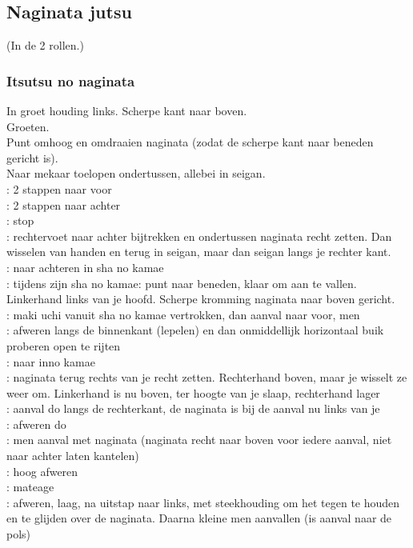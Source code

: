 \subsection{Naginata jutsu}
(In de 2 rollen.)

\subsubsection{Itsutsu no naginata}

In groet houding links. Scherpe kant naar boven.\\
Groeten.\\
Punt omhoog en omdraaien naginata (zodat de scherpe kant naar beneden gericht is).\\
Naar mekaar toelopen ondertussen, allebei in seigan.\\
\pA: 2 stappen naar voor\\
\pB: 2 stappen naar achter\\
\pA: stop\\
\pB: rechtervoet naar achter bijtrekken en ondertussen naginata recht zetten. Dan wisselen van handen en terug in seigan, maar dan seigan langs je rechter kant.\\
\pA: naar achteren in sha no kamae\\
\pB: tijdens \pA zijn sha no kamae: punt naar beneden, klaar om aan te vallen. Linkerhand links van je hoofd. Scherpe kromming naginata naar boven gericht.\\
\pA: maki uchi vanuit sha no kamae vertrokken, dan aanval naar voor, men\\
\pB: afweren langs de binnenkant (lepelen) en dan onmiddellijk horizontaal buik proberen open te rijten\\
\pA: naar inno kamae\\
\pB: naginata terug rechts van je recht zetten. Rechterhand boven, maar je wisselt ze weer om. Linkerhand is nu boven, ter hoogte van je slaap, rechterhand lager\\
\pB: aanval do langs de rechterkant, de naginata is bij de aanval nu links van je\\
\pA: afweren do\\
\pB: men aanval met naginata (naginata recht naar boven voor iedere aanval, niet naar achter laten kantelen)\\
\pA: hoog afweren\\
\pB: mateage\\
\pA: afweren, laag, na uitstap naar links, met steekhouding om het tegen te houden en te glijden over de naginata. Daarna kleine men aanvallen (is aanval naar de pols)\\
